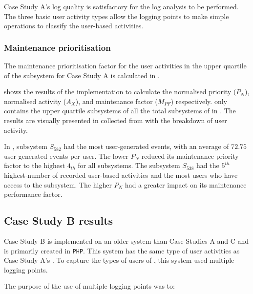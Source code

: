 Case Study A's log quality is satisfactory for the log analysis to be performed. The three basic user activity types allow the logging points to make simple operations to classify the user-based activities. 

\clearpage

\subsubsection{Maintenance prioritisation}
The maintenance prioritisation factor for the user activities in the upper quartile of the subsystem for Case Study A is calculated in .



 shows the results of the implementation  to calculate the normalised priority ($P_N$), normalised activity ($A_X$), and maintenance factor ($M_{PF}$) respectively.  only contains the upper quartile subsystems of all the total subsystems of  in . The results are visually presented in  collected from  with the breakdown of user activity. \par In , subsystem $S_{582}$ had the most user-generated events, with an average of $72.75$ user-generated events per user. The lower $P_N$ reduced its maintenance priority factor to the highest $4_{th}$ for all subsystems. The subsystem $S_{538}$ had the $5^{th}$ highest-number of recorded user-based activities and the most users who have access to the subsystem. The higher $P_N$ had a greater impact on its maintenance performance factor. 

\clearpage

\subsection{Case Study B results}\label{sec:ch3_csB}
Case Study B is implemented on an older system than Case Studies A and C and is primarily created in \texttt{PHP}. This system has the same type of user activities as Case Study A's . To capture the types of users of , this system used multiple logging points. \par The purpose of the use of multiple logging points was to:


